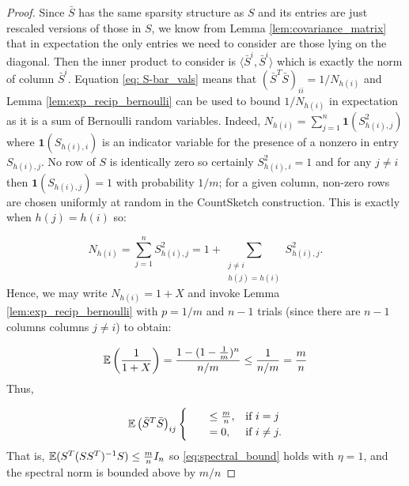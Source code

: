 \begin{proof}
  Since $\bar{S}$ has the same sparsity structure as $S$
  and its entries are just
  rescaled versions of those in $S$, we know from Lemma \ref{lem:covariance_matrix} that in expectation the only entries we need to consider
  are those lying on the diagonal.
  Then the inner product to consider is $\langle \bar{S}^i, \bar{S}^i \rangle$
  which  is exactly the norm of column $\bar{S}^i$.
  Equation \eqref{eq: S-bar_vals} means that $(\bar{S}^T \bar{S})_{ii} = 1/
  N_{h(i)}$ and
  Lemma \ref{lem:exp_recip_bernoulli} can be used to bound $1/ N_{h(i)}$ in
  expectation
  as it is a sum of Bernoulli random variables.
Indeed, $N_{h(i)} = \sum_{j=1}^n \mathbf{1}(S_{h(i),j}^2)$ where $\mathbf{1}
  (S_{h(i),i})$ is an indicator variable for the presence of a nonzero in entry
  $S_{h(i),j}$.
  No row of $S$ is identically zero so certainly $S_{h(i), i}^2 = 1$ and for
  any $j \ne i$ then $\mathbf{1}(S_{h(i),j}) = 1$ with probability $1/m$; for a
  given column, non-zero rows are chosen uniformly at random in the CountSketch
  construction.
  This is exactly when $h(j) = h(i)$ so:

  \begin{equation} \label{eq: split_row}
    N_{h(i)} = \sum_{j=1}^n S_{h(i), j}^2 = 1 + \sum_{\substack{ j \ne
     i \\ h(j) = h(i)}} S_{h(i), j}^2.
  \end{equation}
  Hence, we may write $N_{h(i)} = 1+X$
  and invoke Lemma \ref{lem:exp_recip_bernoulli} with $p=1/m$ and $n-1$
  trials (since there are $n-1$ columns  columns $j \ne i$) to obtain:

\[
\E \left( \frac{1}{1+X} \right) %
= \frac{1 - (1-\frac{1}{m})^n}{n/m}
\le \frac{1}{n/m} = \frac{m}{n}
\]
Thus, 

  \begin{equation}
    \mathbb{E} \left( \bar{S}^T \bar{S} \right)_{ij} 
    \begin{cases}
      \qquad\le \frac{m}{n}, & \text{if}\ i=j \\
      \qquad= 0, & \text{if}\ i \ne j.
    \end{cases}
  \end{equation}
That is, $\mathbb{E} (S^T (SS^T)^{-1}S) \leq \frac{m}{n} I_n$
so \eqref{eq:spectral_bound} holds with $\eta = 1$,
and the spectral norm is bounded above by $m/n$ 
\end{proof}

